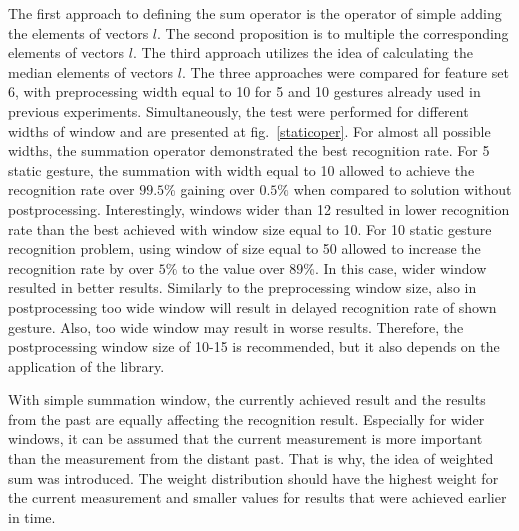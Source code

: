  

The first approach to defining the sum operator is the operator of simple adding the elements of vectors $l$.
The second proposition is to multiple the corresponding elements of vectors $l$. 
The third approach utilizes the idea of calculating the median elements of vectors $l$.
The three approaches were compared for feature set 6, with preprocessing width equal to 10 for 5 and 10 gestures already used in previous experiments.
Simultaneously, the test were performed for different widths of window and are presented at fig.~\ref{staticoper}.
For almost all possible widths, the summation operator demonstrated the best recognition rate.
For 5 static gesture, the summation with width equal to 10 allowed to achieve the recognition rate over $99.5$\% gaining over $0.5\%$ when compared to solution without postprocessing.
Interestingly, windows wider than 12 resulted in lower recognition rate than the best achieved with window size equal to 10.
For 10 static gesture recognition problem, using window of size equal to 50 allowed to increase the recognition rate by over $5\%$ to the value over $89$\%.
In this case, wider window resulted in better results. 
Similarly to the preprocessing window size, also in postprocessing too wide window will result in delayed recognition rate of shown gesture.
Also, too wide window may result in worse results.
Therefore, the postprocessing window size of 10-15 is recommended, but it also depends on the application of the library.

With simple summation window, the currently achieved result and the results from the past are equally affecting the recognition result. 
Especially for wider windows, it can be assumed that the current measurement is more important than the measurement from the distant past.
That is why, the idea of weighted sum was introduced.
The weight distribution should have the highest weight for the current measurement and smaller values for results that were achieved earlier in time.

